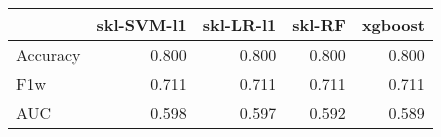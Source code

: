 \begin{tabular}{lrrrr}
\toprule
{} &  skl-SVM-l1 &  skl-LR-l1 &  skl-RF &  xgboost \\
\midrule
Accuracy &       0.800 &      0.800 &   0.800 &    0.800 \\
F1w      &       0.711 &      0.711 &   0.711 &    0.711 \\
AUC      &       0.598 &      0.597 &   0.592 &    0.589 \\
\bottomrule
\end{tabular}

